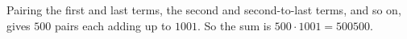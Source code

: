 Pairing the first and last terms, the second and second-to-last terms, and so on, gives $500$ pairs each adding up to $1001$. So the sum is $500\cdot1001=\boxed{500500}$.
